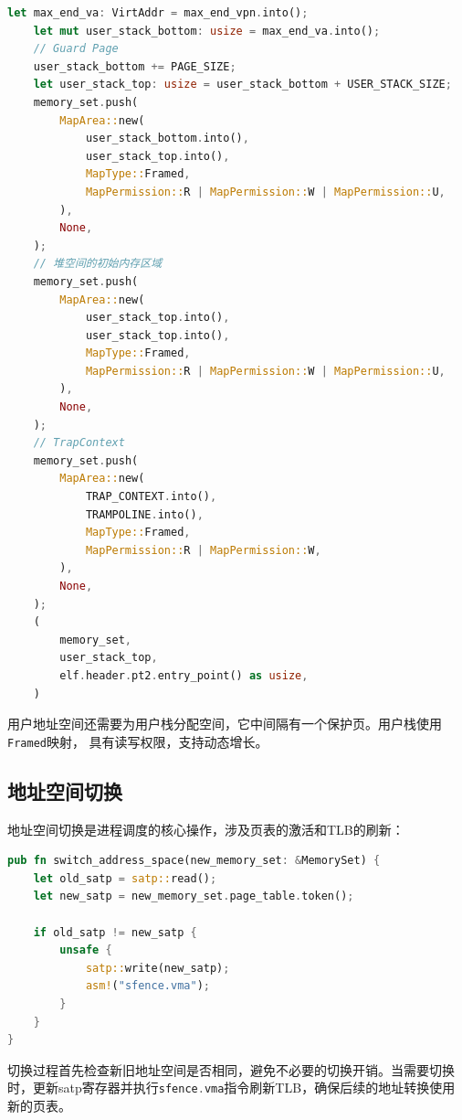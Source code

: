 \begin{lstlisting}[language=Rust,caption={用户栈映射}, label={lst:user-stack-map}]
    let max_end_va: VirtAddr = max_end_vpn.into();
    let mut user_stack_bottom: usize = max_end_va.into();
    // Guard Page
    user_stack_bottom += PAGE_SIZE;
    let user_stack_top: usize = user_stack_bottom + USER_STACK_SIZE;
    memory_set.push(
        MapArea::new(
            user_stack_bottom.into(),
            user_stack_top.into(),
            MapType::Framed,
            MapPermission::R | MapPermission::W | MapPermission::U,
        ),
        None,
    );
    // 堆空间的初始内存区域
    memory_set.push(
        MapArea::new(
            user_stack_top.into(),
            user_stack_top.into(),
            MapType::Framed,
            MapPermission::R | MapPermission::W | MapPermission::U,
        ),
        None,
    );
    // TrapContext
    memory_set.push(
        MapArea::new(
            TRAP_CONTEXT.into(),
            TRAMPOLINE.into(),
            MapType::Framed,
            MapPermission::R | MapPermission::W,
        ),
        None,
    );
    (
        memory_set,
        user_stack_top,
        elf.header.pt2.entry_point() as usize,
    )
\end{lstlisting}

用户地址空间还需要为用户栈分配空间，它中间隔有一个保护页。用户栈使用\lstinline[language=Rust]{Framed}映射，
具有读写权限，支持动态增长。

\subsection{地址空间切换}

地址空间切换是进程调度的核心操作，涉及页表的激活和TLB的刷新：

\begin{lstlisting}[language=Rust,caption={地址空间切换机制}, label={lst:address-space-switch}]
pub fn switch_address_space(new_memory_set: &MemorySet) {
    let old_satp = satp::read();
    let new_satp = new_memory_set.page_table.token();
    
    if old_satp != new_satp {
        unsafe {
            satp::write(new_satp);
            asm!("sfence.vma");
        }
    }
}
\end{lstlisting}

切换过程首先检查新旧地址空间是否相同，避免不必要的切换开销。当需要切换时，更新satp寄存器并执行\lstinline[language=Rust]{sfence.vma}指令刷新TLB，确保后续的地址转换使用新的页表。
